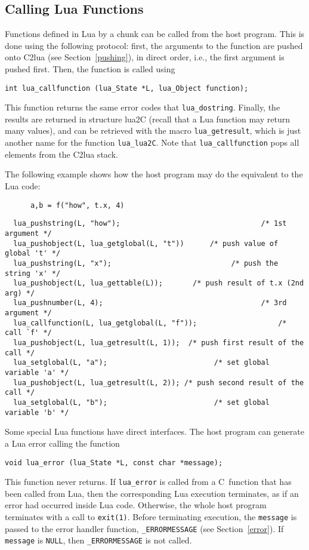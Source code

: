 \documentclass[11pt]{article}
\newcommand{\See}[1]{Section~\ref{#1}}
\newcommand{\see}[1]{(see \See{#1})}
\newcommand{\Deffunc}[1]{\index{#1}}
\begin{document}
\subsection{Calling Lua Functions}
Functions defined in Lua by a chunk
can be called from the host program.
This is done using the following protocol:
first, the arguments to the function are pushed onto C2lua
\see{pushing}, in direct order, i.e., the first argument is pushed first.
Then, the function is called using
\Deffunc{lua_callfunction}
\begin{verbatim}
int lua_callfunction (lua_State *L, lua_Object function);
\end{verbatim}
This function returns the same error codes that \verb|lua_dostring|.
Finally, the results are returned in structure lua2C
(recall that a Lua function may return many values),
and can be retrieved with the macro \verb|lua_getresult|,
\Deffunc{lua_getresult}
which is just another name for the function \verb|lua_lua2C|.
Note that \verb|lua_callfunction|
pops all elements from the C2lua stack.

The following example shows how the host program may do the
equivalent to the Lua code:
\begin{verbatim}
      a,b = f("how", t.x, 4)
\end{verbatim}
\begin{verbatim}
  lua_pushstring(L, "how");                                 /* 1st argument */
  lua_pushobject(L, lua_getglobal(L, "t"))      /* push value of global 't' */
  lua_pushstring(L, "x");                            /* push the string 'x' */
  lua_pushobject(L, lua_gettable(L));       /* push result of t.x (2nd arg) */
  lua_pushnumber(L, 4);                                     /* 3rd argument */
  lua_callfunction(L, lua_getglobal(L, "f"));                   /* call `f' */
  lua_pushobject(L, lua_getresult(L, 1));  /* push first result of the call */
  lua_setglobal(L, "a");                         /* set global variable 'a' */
  lua_pushobject(L, lua_getresult(L, 2)); /* push second result of the call */
  lua_setglobal(L, "b");                         /* set global variable 'b' */
\end{verbatim}

Some special Lua functions have direct interfaces.
The host program can generate a Lua error calling the function
\Deffunc{lua_error}
\begin{verbatim}
void lua_error (lua_State *L, const char *message);
\end{verbatim}
This function never returns.
If \verb|lua_error| is called from a C~function that has been called from Lua,
then the corresponding Lua execution terminates,
as if an error had occurred inside Lua code.
Otherwise, the whole host program terminates with a call to \verb|exit(1)|.
Before terminating execution,
the \verb|message| is passed to the error handler function,
\verb|_ERRORMESSAGE| \see{error}.
If \verb|message| is \verb|NULL|,
then \verb|_ERRORMESSAGE| is not called.
\end{document}
